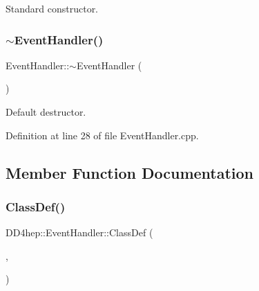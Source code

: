 Standard constructor. 

\hypertarget{class_d_d4hep_1_1_event_handler_a3decb8cd88ba8af2b9b0b0f0f2fcd722}{}\label{class_d_d4hep_1_1_event_handler_a3decb8cd88ba8af2b9b0b0f0f2fcd722} 
\subsubsection{\texorpdfstring{$\sim$\+Event\+Handler()}{~EventHandler()}}
{\footnotesize\ttfamily Event\+Handler\+::$\sim$\+Event\+Handler (\begin{DoxyParamCaption}{ }\end{DoxyParamCaption})\hspace{0.3cm}{\ttfamily [virtual]}}



Default destructor. 



Definition at line 28 of file Event\+Handler.\+cpp.



\subsection{Member Function Documentation}
\hypertarget{class_d_d4hep_1_1_event_handler_a44c310a4296693f09e62adbac3fbe2c6}{}\label{class_d_d4hep_1_1_event_handler_a44c310a4296693f09e62adbac3fbe2c6} 
\subsubsection{\texorpdfstring{Class\+Def()}{ClassDef()}}
{\footnotesize\ttfamily D\+D4hep\+::\+Event\+Handler\+::\+Class\+Def (\begin{DoxyParamCaption}\item[{\hyperlink{class_d_d4hep_1_1_event_handler}{Event\+Handler}}]{,  }\item[{0}]{ }\end{DoxyParamCaption})}

\hypertarget{class_d_d4hep_1_1_event_handler_a454baeb81b675f3ebd8bb4293064b787}{}\label{class_d_d4hep_1_1_event_handler_a454baeb81b675f3ebd8bb4293064b787} 
